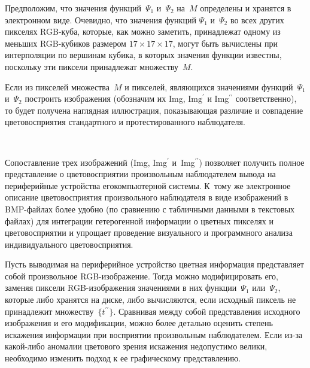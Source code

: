 \begin{multicols}{2}
  Предположим, что значения функций~$\Psi_1$ и~$\Psi_2$  на~$M$ 
определены и хранятся в электронном виде. Очевидно, что значения функций 
$\Psi_1$ и~$\Psi_2$ во всех других пикселях RGB-ку\-ба, которые, как можно 
заметить, принадлежат одному из меньших RGB-ку\-би\-ков размером 
$17\times 17\times 17$, могут быть вычислены при интерполяции по вершинам 
кубика, в которых значения функции известны, поскольку эти пиксели 
принадлежат множеству~$M$.
  
  Если из пикселей множества~$M$ и пикселей, являющихся значениями 
функций~$\Psi_1$ и~$\Psi_2$ построить изображения (обозначим их Img, 
$\mathrm{Img}^\prime$ и Img$^{\prime\prime}$ соответственно), то будет получена 
наглядная иллюстрация, показывающая различие и совпадение 
цветовосприятия стандартного и протестированного наблюдателя.

  \begin{figure*}[b] %
  \vspace*{1pt}
\begin{center}
\mbox{%
\epsfxsize=76.729mm
}
\end{center}
\vspace*{-6pt}
   \end{figure*}
  
  Сопоставление трех изображений (Img, Img$^\prime$ 
и~Img$^{\prime\prime}$) позволяет получить полное представление о 
цветовосприятии произвольным наблюдателем вывода на периферийные 
устройства его\linebreak компьютерной системы. К~тому же электронное описание 
цветовосприятия произвольного наблюдателя в виде изображений в 
  BMP-файлах более удобно (по сравнению с табличными данными в 
текстовых файлах) для интеграции гетерогенной информации о цветных 
пикселях и цветовосприятии и упрощает проведение визуального и 
программного анализа индивидуального цветовосприятия. 
  
  Пусть выводимая на периферийное устройство цветная информация 
представляет собой произвольное RGB-изоб\-ра\-же\-ние. Тогда можно 
модифицировать его, заменяя пиксели RGB-изоб\-ра\-же\-ния значениями в 
них функции~$\Psi_1$ или~$\Psi_2$, которые либо хранятся на диске, либо 
вычисляются, если исходный пиксель не принадлежит 
множеству~$\{t^{\prime\prime}\}$. Сравнивая между собой представления 
исходного изображения и его модификации, можно более детально оценить 
степень искажения информации при восприятии произвольным наблюдателем. 
Если из-за какой-либо аномалии цветового зрения искажения недопустимо 
велики, необходимо изменить подход к ее графическому представлению.
  

\end{multicols}
